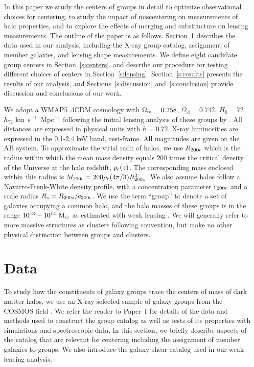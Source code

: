 \documentclass[12pt]{emulateapj}
\begin{document}
In this paper we study the centers of groups in
detail to optimize observational choices for centering, to study the
impact of miscentering on measurements of halo properties, and to
explore the effects of merging and substructure on lensing
measurements. The outline of the paper is as follows. Section~\ref{s:data} describes the data used in our
analysis, including the X-ray group catalog, assignment of member galaxies,
and lensing shape measurements. We define eight candidate group
centers in Section~\ref{s:centers}, and describe our procedure for
testing different choices of centers in Section~\ref{s:lensing}. Section~\ref{s:results}
presents the results of our analysis, and Sections~\ref{s:discussion}
and~\ref{s:conclusion} provide discussion and conclusions of our work.

We adopt a WMAP5 $\Lambda$CDM cosmology with $\Omega_{\rm m}=0.258$,
$\Omega_\Lambda=0.742$, $H_0=72$ $h_{72}$ km~s$^{-1}$~Mpc$^{-1}$
\citep{Dunkley2009} following the initial lensing analysis of these
groups by \citet{Leauthaud2010}. All distances are expressed in
physical units with $h=0.72$. X-ray luminosities are expressed in the 0.1-2.4 keV
band, rest-frame. All magnitudes are given on the AB system. To
approximate the virial radii of halos, we use $R_{\rm 200c}$ which is
the radius within which the mean mass density equals 200 times the
critical density of the Universe at the halo redshift, $\rho_{\rm
  c}(z)$. The corresponding mass enclosed within this radius is
$M_{\rm 200c}=200\rho_{\rm c}(4\pi/3)R_{\rm 200c}^3$. We also assume
halos follow a Navarro-Frenk-White \citep[NFW, ][]{Navarro1996} density
profile, with a concentration parameter $c_{\rm 200c}$ and a scale radius
$R_{s}=R_{\rm 200c}/c_{\rm 200c}$. We use the term ``group'' to 
denote a set of galaxies occupying a common halo, and the halo masses
of these groups is in the range $10^{13}-10^{14}~{\rm M_{\odot}}$ as
estimated with weak lensing \citep{Leauthaud2010}. We will generally
refer to more massive structures as clusters following convention, but
make no other physical distinction between groups and clusters.


\section{Data}
\label{s:data}

To study how the constituents of galaxy groups trace the centers of
mass of 
dark matter halos, we use an X-ray selected sample of galaxy groups
from the COSMOS field \citep{Scoville2007a}. We refer the reader to
Paper~I for details of the data and methods used to construct the
group catalog as well as tests of its properties with simulations and
spectroscopic data. In this section, we briefly describe aspects of the
catalog that are relevant for centering including the assignment of
member galaxies to groups. We also introduce the galaxy shear catalog
used in our weak lensing analysis.
\end{document}
